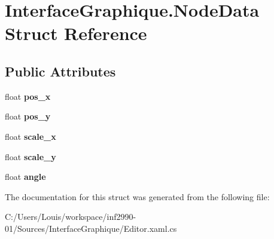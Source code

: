 \hypertarget{struct_interface_graphique_1_1_node_data}{}\section{Interface\+Graphique.\+Node\+Data Struct Reference}
\label{struct_interface_graphique_1_1_node_data}
\subsection*{Public Attributes}
\begin{DoxyCompactItemize}
\item 
\hypertarget{struct_interface_graphique_1_1_node_data_aa65b000f8aca6ca4ef06867dece673bc}{}float {\bfseries pos\+\_\+x}\label{struct_interface_graphique_1_1_node_data_aa65b000f8aca6ca4ef06867dece673bc}

\item 
\hypertarget{struct_interface_graphique_1_1_node_data_a9f8a6932e2af21e5c9de9ca0da1b10d5}{}float {\bfseries pos\+\_\+y}\label{struct_interface_graphique_1_1_node_data_a9f8a6932e2af21e5c9de9ca0da1b10d5}

\item 
\hypertarget{struct_interface_graphique_1_1_node_data_af70290d20df57f31d3836eb0d43849f8}{}float {\bfseries scale\+\_\+x}\label{struct_interface_graphique_1_1_node_data_af70290d20df57f31d3836eb0d43849f8}

\item 
\hypertarget{struct_interface_graphique_1_1_node_data_a40c67aeb78481a26523814f70e839ddd}{}float {\bfseries scale\+\_\+y}\label{struct_interface_graphique_1_1_node_data_a40c67aeb78481a26523814f70e839ddd}

\item 
\hypertarget{struct_interface_graphique_1_1_node_data_a667c8cab7e202742610cb8ce22ad1e45}{}float {\bfseries angle}\label{struct_interface_graphique_1_1_node_data_a667c8cab7e202742610cb8ce22ad1e45}

\end{DoxyCompactItemize}


The documentation for this struct was generated from the following file\+:\begin{DoxyCompactItemize}
\item 
C\+:/\+Users/\+Louis/workspace/inf2990-\/01/\+Sources/\+Interface\+Graphique/Editor.\+xaml.\+cs\end{DoxyCompactItemize}
